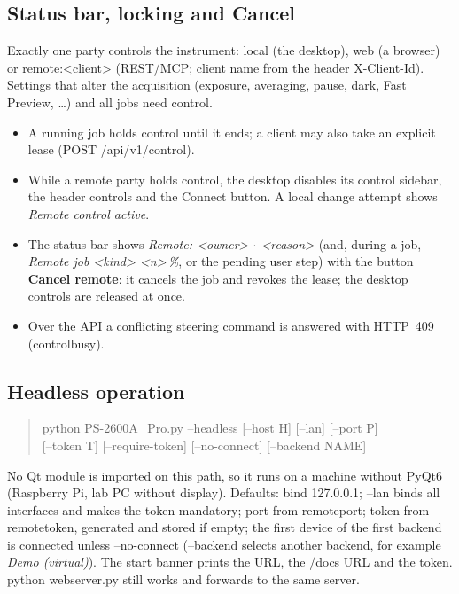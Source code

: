 \documentclass[12pt,a4paper]{article}
\DeclareRobustCommand{\code}[1]{{\ttfamily\small\def\_{\rawus\allowbreak}#1}}
\DeclareRobustCommand{\key}[1]{{\ttfamily\small\color{acc2}\def\_{\rawus\allowbreak}#1}}
\begin{document}
\subsection{Status bar, locking and Cancel}\label{sec:control}
Exactly one party controls the instrument: \code{local} (the desktop),
\code{web} (a browser) or \code{remote:<client>} (REST/MCP; client name from the
header \code{X-Client-Id}). Settings that alter the acquisition (exposure,
averaging, pause, dark, Fast Preview, \dots) and all jobs need control.
\begin{itemize}
  \item A running job holds control until it ends; a client may also take an
        explicit lease (\code{POST /api/v1/control}).
  \item While a remote party holds control, the desktop disables its control
        sidebar, the header controls and the Connect button. A local change
        attempt shows \emph{Remote control active}.
  \item The status bar shows \emph{Remote: <owner> $\cdot$ <reason>} (and, during a
        job, \emph{Remote job <kind> <n>\,\%}, or the pending user step) with the
        button \textbf{Cancel remote}: it cancels the job and revokes the lease; the
        desktop controls are released at once.
  \item Over the API a conflicting steering command is answered with HTTP~409
        (\code{control\_busy}).
\end{itemize}

\subsection{Headless operation}
\begin{quote}\ttfamily\small
python PS-2600A\_Pro.py --headless [--host H] [--lan] [--port P]\\
\hspace*{2em}[--token T] [--require-token] [--no-connect] [--backend NAME]
\end{quote}
No Qt module is imported on this path, so it runs on a machine without PyQt6
(Raspberry Pi, lab PC without display). Defaults: bind \code{127.0.0.1}; \code{--lan}
binds all interfaces and makes the token mandatory; port from \key{remote\_port};
token from \key{remote\_token}, generated and stored if empty; the first device of
the first backend is connected unless \code{--no-connect} (\code{--backend}
selects another backend, for example \emph{Demo (virtual)}). The start banner prints
the URL, the \code{/docs} URL and the token. \code{python web\_server.py} still
works and forwards to the same server.
\end{document}
